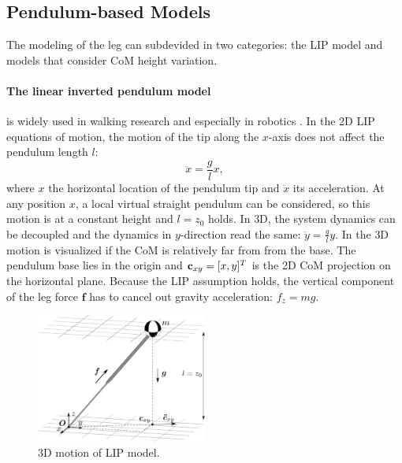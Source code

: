 \subsection{Pendulum-based Models}
The modeling of the leg can subdevided in two categories: the \ac{LIP} model and models that consider \ac{CoM} height variation. 
\paragraph{The linear inverted pendulum model} is widely used in walking research and especially in robotics \cite{kajita20013d}. In the \ac{2D} \ac{LIP} equations of motion, the motion of the tip along the $x$-axis does not affect the pendulum length $l$:
\begin{equation}
\ddot{x}=\frac{g}{l}x,
\label{eq:LIPeom}
\end{equation}
where $x$ the horizontal location of the pendulum tip and $\ddot{x}$ its acceleration. At any position $x$, a local virtual straight pendulum can be considered, so this motion is at a constant height and $l=z_0$  holds. In \ac{3D}, the system dynamics can be decoupled and the dynamics in $y$-direction read the same: $\ddot{y}=\frac{g}{l} y$. In  the \ac{3D} motion is visualized if the \ac{CoM} is relatively far from from the base. The pendulum base lies in the origin and $\mathbf{c}_{xy} = [x,y]^T$ is the \ac{2D} \ac{CoM} projection on the horizontal plane. Because the \ac{LIP} assumption holds, the vertical component of the leg force $\boldsymbol{f}$ has to cancel out gravity acceleration: $f_z=mg$.\\
\begin{figure}[h]
\centering
\includegraphics[width=0.5\textwidth]{STYLESTUFF/3DCoMwithoutfoot.png}
\caption{\ac{3D} motion of \ac{LIP} model.}
\label{fig:3dlip}
\end{figure}

